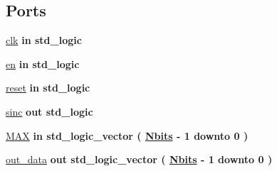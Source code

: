 \subsection*{Ports}
 \begin{DoxyCompactItemize}
\item 
\hyperlink{classwt_a4a4609c199d30b3adebbeb3a01276ec5}{clk}  {\bfseries {\bfseries \textcolor{keywordflow}{in}\textcolor{vhdlchar}{ }}} {\bfseries \textcolor{comment}{std\+\_\+logic}\textcolor{vhdlchar}{ }} 
\item 
\hyperlink{classwt_adcf9c6f5161d039addbda5819bee64a3}{en}  {\bfseries {\bfseries \textcolor{keywordflow}{in}\textcolor{vhdlchar}{ }}} {\bfseries \textcolor{comment}{std\+\_\+logic}\textcolor{vhdlchar}{ }} 
\item 
\hyperlink{classwt_aad8dc6359d9e23dabcbf342fadf2fa06}{reset}  {\bfseries {\bfseries \textcolor{keywordflow}{in}\textcolor{vhdlchar}{ }}} {\bfseries \textcolor{comment}{std\+\_\+logic}\textcolor{vhdlchar}{ }} 
\item 
\hyperlink{classwt_aae281cf725515894f893258c629a59c7}{sinc}  {\bfseries {\bfseries \textcolor{keywordflow}{out}\textcolor{vhdlchar}{ }}} {\bfseries \textcolor{comment}{std\+\_\+logic}\textcolor{vhdlchar}{ }} 
\item 
\hyperlink{classwt_aee4ab8d7344759fe51ddf58734fd8b17}{M\+A\+X}  {\bfseries {\bfseries \textcolor{keywordflow}{in}\textcolor{vhdlchar}{ }}} {\bfseries \textcolor{comment}{std\+\_\+logic\+\_\+vector}\textcolor{vhdlchar}{ }\textcolor{vhdlchar}{(}\textcolor{vhdlchar}{ }\textcolor{vhdlchar}{ }\textcolor{vhdlchar}{ }\textcolor{vhdlchar}{ }{\bfseries \hyperlink{classwt_a8b45761acb3f2e683677c4eb77d442b0}{Nbits}} \textcolor{vhdlchar}{-\/}\textcolor{vhdlchar}{ } \textcolor{vhdldigit}{1} \textcolor{vhdlchar}{ }\textcolor{keywordflow}{downto}\textcolor{vhdlchar}{ }\textcolor{vhdlchar}{ } \textcolor{vhdldigit}{0} \textcolor{vhdlchar}{ }\textcolor{vhdlchar}{)}\textcolor{vhdlchar}{ }} 
\item 
\hyperlink{classwt_a44ef009b7a1d3a2266fd763d872c2b76}{out\+\_\+data}  {\bfseries {\bfseries \textcolor{keywordflow}{out}\textcolor{vhdlchar}{ }}} {\bfseries \textcolor{comment}{std\+\_\+logic\+\_\+vector}\textcolor{vhdlchar}{ }\textcolor{vhdlchar}{(}\textcolor{vhdlchar}{ }\textcolor{vhdlchar}{ }\textcolor{vhdlchar}{ }\textcolor{vhdlchar}{ }{\bfseries \hyperlink{classwt_a8b45761acb3f2e683677c4eb77d442b0}{Nbits}} \textcolor{vhdlchar}{-\/}\textcolor{vhdlchar}{ } \textcolor{vhdldigit}{1} \textcolor{vhdlchar}{ }\textcolor{keywordflow}{downto}\textcolor{vhdlchar}{ }\textcolor{vhdlchar}{ } \textcolor{vhdldigit}{0} \textcolor{vhdlchar}{ }\textcolor{vhdlchar}{)}\textcolor{vhdlchar}{ }} 

\end{DoxyCompactItemize}

